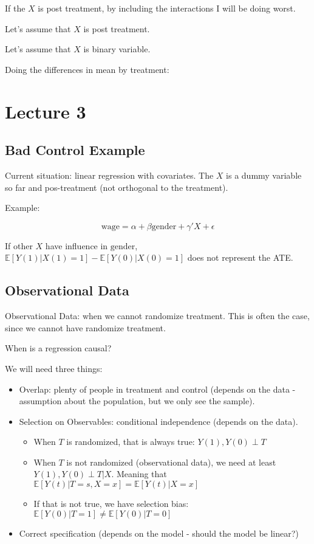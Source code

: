 \documentclass{article}
\begin{document}
If the $X$ is post treatment, by including the interactions I will be doing worst.

Let's assume that $X$ is post treatment.

Let's assume that $X$ is binary variable.

Doing the differences in mean by treatment:

\section{Lecture 3}

\subsection{Bad Control Example}
Current situation: linear regression with covariates. The $X$ is a dummy variable so far and pos-treatment (not orthogonal to the treatment).

Example:

$$
\text{wage} = \alpha + \beta \text{gender} + \gamma'X + \epsilon
$$

If other $X$ have influence in $\text{gender}$, $\mathbb{E}[Y(1) | X(1) = 1] - \mathbb{E}[Y(0) | X(0) = 1]$ does not represent the ATE.

\subsection{Observational Data}
Observational Data: when we cannot randomize treatment. This is often the case, since we cannot have randomize treatment.

When is a regression causal?

We will need three things:
\begin{itemize}
    \item Overlap: plenty of people in treatment and control (depends on the data - assumption about the population, but we only see the sample).
    \item Selection on Observables: conditional independence (depends on the data).
    \begin{itemize}
        \item When $T$ is randomized, that is always true: $Y(1), Y(0) \perp T$
        \item When $T$ is not randomized (observational data), we need at least $Y(1), Y(0) \perp T | X$. Meaning that $\mathbb{E}[Y(t) | T = s, X = x] = \mathbb{E}[Y(t) | X = x]$
        \item If that is not true, we have selection bias: $\mathbb{E}[Y(0) | T = 1] \neq \mathbb{E}[Y(0) | T = 0]$
    \end{itemize}
    \item Correct specification (depends on the model - should the model be linear?)
\end{itemize}
\end{document}
